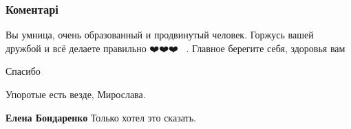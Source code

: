  
 
 
 
 
\subsubsection{Коментарі}

\begin{itemize}
 
Вы умница, очень образованный и продвинутый человек. Горжусь вашей дружбой и
всё делаете правильно ❤️❤️❤️💋💋💋. Главное берегите себя, здоровья вам

\begin{itemize}
 
Спасибо
\end{itemize}

 

Упоротые есть везде, Мирослава.

\begin{itemize}
 
\textbf{Елена Бондаренко} Только хотел это сказать.

 

\end{itemize}
\end{itemize}
